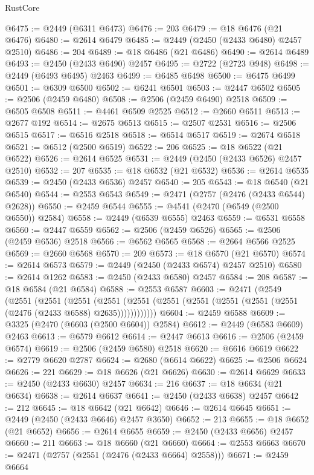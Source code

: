 \begin{lexlean}{RustCore}
\begin{coremodule}
@6475 := @2449 (@6311 @6473)
@6476 := 203
@6479 := @18 @6476 (@21 @6476)
@6480 := @2614 @6479
@6485 := @2449 (@2450 (@2433 @6480) @2457 @2510)
@6486 := 204
@6489 := @18 @6486 (@21 @6486)
@6490 := @2614 @6489
@6493 := @2450 (@2433 @6490) @2457
@6495 := @2722 (@2723 @948)
@6498 := @2449 (@6493 @6495) @2463
@6499 := @6485 @6498
@6500 := @6475 @6499
@6501 := @6309 @6500
@6502 := @6241 @6501
@6503 := @2447 @6502
@6505 := @2506 (@2459 @6480)
@6508 := @2506 (@2459 @6490) @2518
@6509 := @6505 @6508
@6511 := @4461 @6509 @2525
@6512 := @2660 @6511
@6513 := @2677 @192
@6514 := @2675 @6513
@6515 := @2507 @2531
@6516 := @2506 @6515
@6517 := @6516 @2518
@6518 := @6514 @6517
@6519 := @2674 @6518
@6521 := @6512 (@2500 @6519)
@6522 := 206
@6525 := @18 @6522 (@21 @6522)
@6526 := @2614 @6525
@6531 := @2449 (@2450 (@2433 @6526) @2457 @2510)
@6532 := 207
@6535 := @18 @6532 (@21 @6532)
@6536 := @2614 @6535
@6539 := @2450 (@2433 @6536) @2457
@6540 := 205
@6543 := @18 @6540 (@21 @6540)
@6544 := @2553 @6543
@6549 := @2471 (@2757 (@2476 (@2433 @6544) @2628))
@6550 := @2459 @6544
@6555 := @4541 (@2470 (@6549 (@2500 @6550)) @2584)
@6558 := @2449 (@6539 @6555) @2463
@6559 := @6531 @6558
@6560 := @2447 @6559
@6562 := @2506 (@2459 @6526)
@6565 := @2506 (@2459 @6536) @2518
@6566 := @6562 @6565
@6568 := @2664 @6566 @2525
@6569 := @2660 @6568
@6570 := 209
@6573 := @18 @6570 (@21 @6570)
@6574 := @2614 @6573
@6579 := @2449 (@2450 (@2433 @6574) @2457 @2510)
@6580 := @2614 @1262
@6583 := @2450 (@2433 @6580) @2457
@6584 := 208
@6587 := @18 @6584 (@21 @6584)
@6588 := @2553 @6587
@6603 := @2471
    (@2549
      (@2551
        (@2551
          (@2551
            (@2551 (@2551 (@2551 (@2551 (@2551 (@2551 (@2551 (@2476 (@2433 @6588) @2635))))))))))))
@6604 := @2459 @6588
@6609 := @3325 (@2470 (@6603 (@2500 @6604)) @2584)
@6612 := @2449 (@6583 @6609) @2463
@6613 := @6579 @6612
@6614 := @2447 @6613
@6616 := @2506 (@2459 @6574)
@6619 := @2506 (@2459 @6580) @2518
@6620 := @6616 @6619
@6622 := @2779 @6620 @2787
@6624 := @2680 (@6614 @6622)
@6625 := @2506 @6624
@6626 := 221
@6629 := @18 @6626 (@21 @6626)
@6630 := @2614 @6629
@6633 := @2450 (@2433 @6630) @2457
@6634 := 216
@6637 := @18 @6634 (@21 @6634)
@6638 := @2614 @6637
@6641 := @2450 (@2433 @6638) @2457
@6642 := 212
@6645 := @18 @6642 (@21 @6642)
@6646 := @2614 @6645
@6651 := @2449 (@2450 (@2433 @6646) @2457 @3650)
@6652 := 213
@6655 := @18 @6652 (@21 @6652)
@6656 := @2614 @6655
@6659 := @2450 (@2433 @6656) @2457
@6660 := 211
@6663 := @18 @6660 (@21 @6660)
@6664 := @2553 @6663
@6670 := @2471 (@2757 (@2551 (@2476 (@2433 @6664) @2558)))
@6671 := @2459 @6664

\end{coremodule}
\end{lexlean}
